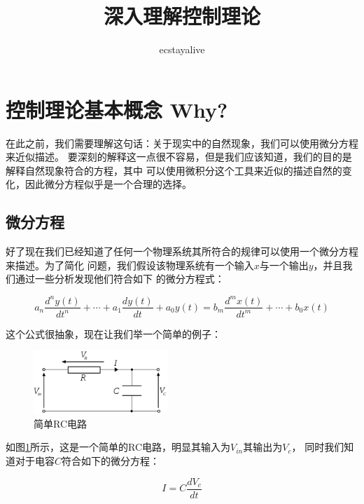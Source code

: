 \documentclass{ctexart}
\begin{document}
\title{深入理解控制理论}
\author{ecstayalive}
\maketitle

\section*{控制理论基本概念 Why?}
在此之前，我们需要理解这句话：关于现实中的自然现象，我们可以使用微分方程来近似描述。
要深刻的解释这一点很不容易，但是我们应该知道，我们的目的是解释自然现象符合的方程，其中
可以使用微积分这个工具来近似的描述自然的变化，因此微分方程似乎是一个合理的选择。

\subsection*{微分方程}
好了现在我们已经知道了任何一个物理系统其所符合的规律可以使用一个微分方程来描述。为了简化
问题，我们假设该物理系统有一个输入$x$与一个输出$y$，并且我们通过一些分析发现他们符合如下
的微分方程式：

\begin{equation}
    a_n \frac{d^n y(t)}{d t^n} +
    \cdots + a_1 \frac{d y(t)}{dt} + a_0 y(t)
    = b_m \frac{d^m x(t)}{d t^m} +
    \cdots + b_0 x(t)
    \label{eq:1}
\end{equation}

这个公式很抽象，现在让我们举一个简单的例子：

\begin{figure}[H]
    \centering
    \includegraphics[width=0.45\textwidth]{./pics/deeply_understand_control_theory/1.png}
    \caption{简单RC电路}
    \label{Fig.1}
\end{figure}

如图\ref{Fig.1}所示，这是一个简单的RC电路，明显其输入为$V_{in}$其输出为$V_c$，
同时我们知道对于电容$C$符合如下的微分方程：

\begin{equation}
    I = C \frac{d V_c}{d t}
    \label{eq:2}
\end{equation}
\end{document}
